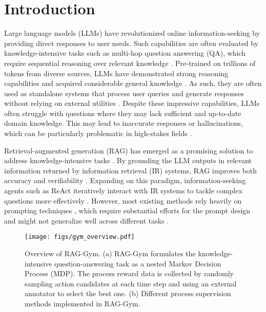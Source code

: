 \section{Introduction}

Large language models (LLMs) have revolutionized online information-seeking by providing direct responses to user needs. Such capabilities are often evaluated by knowledge-intensive tasks such as multi-hop question answering (QA), which require sequential reasoning over relevant knowledge \cite{lewis2020retrieval,welbl2018constructing,tang2024multihop}. Pre-trained on trillions of tokens from diverse sources, LLMs have demonstrated strong reasoning capabilities and acquired considerable general knowledge \cite{wei2022emergent}. As such, they are often used as standalone systems that process user queries and generate responses without relying on external utilities \cite{brown2020language,achiam2023gpt,touvron2023llama1,touvron2023llama2}. Despite these impressive capabilities, LLMs often struggle with questions where they may lack sufficient and up-to-date domain knowledge. This may lead to inaccurate responses or hallucinations, which can be particularly problematic in high-stakes fields \cite{zhang2023siren,sahoo2024large,ji2023survey}.

Retrieval-augmented generation (RAG) has emerged as a promising solution to address knowledge-intensive tasks \cite{lewis2020retrieval}. By grounding the LLM outputs in relevant information returned by information retrieval (IR) systems, RAG improves both accuracy and verifiability \cite{gao2023retrieval}. Expanding on this paradigm, information-seeking agents such as ReAct \cite{yao2023react} iteratively interact with IR systems to tackle complex questions more effectively \cite{yao2023react,asai2023self,shinn2024reflexion,li2025search}. However, most existing methods rely heavily on prompting techniques \cite{trivedi2023interleaving,asai2023self,jiang2023active,press2023measuring}, which require substantial efforts for the prompt design and might not generalize well across different tasks \cite{khot2022decomposed,shao2023enhancing,yu2024autorag}.

\begin{figure*}[ht!]
    \centering
    \texttt{[image: figs/gym\_overview.pdf]}
    \caption{Overview of RAG-Gym. (a) RAG-Gym formulates the knowledge-intensive question-answering task as a nested Markov Decision Process (MDP). The process reward data is collected by randomly sampling action candidates at each time step and using an external annotator to select the best one. (b) Different process supervision methods implemented in RAG-Gym.}
    \label{fig:rag_gym_mdp}
\end{figure*}

